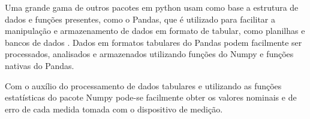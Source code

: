 

Uma grande gama de outros pacotes em python usam como base a estrutura de dados e funções presentes, como o Pandas, que é utilizado para facilitar a manipulação e
armazenamento de dados em formato de tabular, como planilhas e bancos de dados \autocite{DocsPandas}.
Dados em formatos tabulares do Pandas podem facilmente ser processados, analisados e armazenados utilizando funções do Numpy e funções nativas do Pandas.

Com o auxílio do processamento de dados tabulares e utilizando as funções estatísticas do pacote Numpy pode-se facilmente obter os valores nominais e de erro de cada medida
tomada com o dispositivo de medição.

